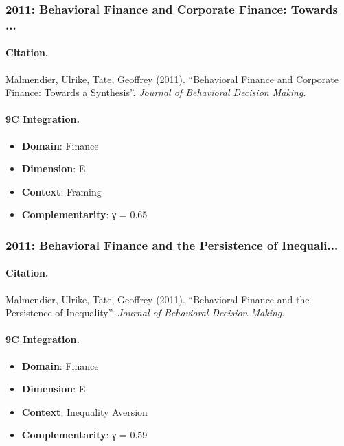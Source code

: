 \subsubsection{2011: Behavioral Finance and Corporate Finance: Towards ...}

\paragraph{Citation.}
Malmendier, Ulrike, Tate, Geoffrey (2011). ``Behavioral Finance and Corporate Finance: Towards a Synthesis''. \textit{Journal of Behavioral Decision Making}.

\paragraph{9C Integration.}
\begin{itemize}[nosep]
  \item \textbf{Domain}: Finance
  \item \textbf{Dimension}: E
  \item \textbf{Context}: Framing
  \item \textbf{Complementarity}: γ = 0.65
\end{itemize}


\subsubsection{2011: Behavioral Finance and the Persistence of Inequali...}

\paragraph{Citation.}
Malmendier, Ulrike, Tate, Geoffrey (2011). ``Behavioral Finance and the Persistence of Inequality''. \textit{Journal of Behavioral Decision Making}.

\paragraph{9C Integration.}
\begin{itemize}[nosep]
  \item \textbf{Domain}: Finance
  \item \textbf{Dimension}: E
  \item \textbf{Context}: Inequality Aversion
  \item \textbf{Complementarity}: γ = 0.59
\end{itemize}


